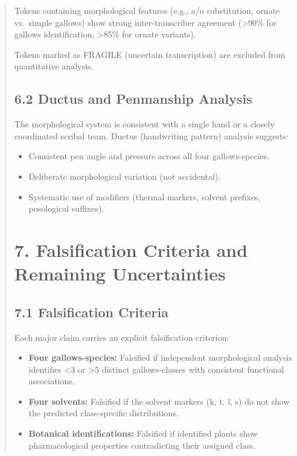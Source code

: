 \documentclass[11pt,a4paper]{article}
\begin{document}
\begin{abstract}
Tokens containing morphological features (e.g., a/o substitution, ornate vs.\ simple gallows) show strong inter-transcriber agreement (>90\% for gallows identification, >85\% for ornate variants).

Tokens marked as FRAGILE (uncertain transcription) are excluded from quantitative analysis.

\subsection*{6.2 Ductus and Penmanship Analysis}

The morphological system is consistent with a single hand or a closely coordinated scribal team. Ductus (handwriting pattern) analysis suggests:

\begin{itemize}
\item Consistent pen angle and pressure across all four gallows-species.
\item Deliberate morphological variation (not accidental).
\item Systematic use of modifiers (thermal markers, solvent prefixes, posological suffixes).
\end{itemize}

\section*{7. Falsification Criteria and Remaining Uncertainties}

\subsection*{7.1 Falsification Criteria}

Each major claim carries an explicit falsification criterion:

\begin{itemize}
\item \textbf{Four gallows-species:} Falsified if independent morphological analysis identifies <3 or >5 distinct gallows-classes with consistent functional associations.
  
\item \textbf{Four solvents:} Falsified if the solvent markers (k, t, l, s) do not show the predicted class-specific distributions.
  
\item \textbf{Botanical identifications:} Falsified if identified plants show pharmacological properties contradicting their assigned class.
  

\end{itemize}
\end{abstract}
\end{document}
